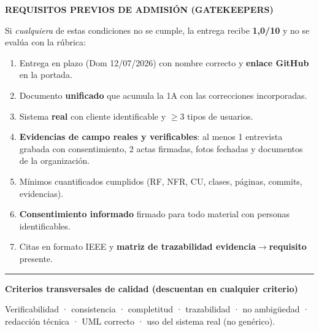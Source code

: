 \documentclass[11pt,a4paper]{article}
\newcounter{secc}
\newcommand{\secband}[1]{%
  \stepcounter{secc}\par\vspace{9pt}\noindent
  {\setlength{\fboxsep}{0pt}%
   \colorbox{uteqgold}{\parbox[c][20pt][c]{0.05\textwidth}{\centering\textbf{\color{white}\small \arabic{secc}}}}%
   \colorbox{uteqgreen}{\parbox[c][20pt][c]{0.95\textwidth}{\hspace{8pt}\textbf{\color{white}\small #1}}}%
  }\par\vspace{5pt}}
\newcommand{\submark}[1]{\par\vspace{4pt}\noindent
  {\color{uteqgreen}\rule[-1pt]{3.5pt}{12pt}}\hspace{6pt}\textbf{\color{uteqgreen}#1}\par\vspace{2pt}}
\begin{document}
\secband{REQUISITOS PREVIOS DE ADMISIÓN (GATEKEEPERS)}
\begin{alertbox}
\small Si \emph{cualquiera} de estas condiciones no se cumple, la entrega recibe \textbf{1,0/10} y no se evalúa con la rúbrica:
\begin{enumerate}[label=\textbf{G\arabic*.},itemsep=1pt]
\item Entrega en plazo (Dom 12/07/2026) con nombre correcto y \textbf{enlace GitHub} en la portada.
\item Documento \textbf{unificado} que acumula la 1A con las correcciones incorporadas.
\item Sistema \textbf{real} con cliente identificable y $\ge$3 tipos de usuarios.
\item \textbf{Evidencias de campo reales y verificables}: al menos 1 entrevista grabada con consentimiento, 2 actas firmadas, fotos fechadas y documentos de la organización.
\item Mínimos cuantificados cumplidos (RF, NFR, CU, clases, páginas, commits, evidencias).
\item \textbf{Consentimiento informado} firmado para todo material con personas identificables.
\item Citas en formato IEEE y \textbf{matriz de trazabilidad evidencia$\rightarrow$requisito} presente.
\end{enumerate}
\end{alertbox}

\submark{Criterios transversales de calidad (descuentan en cualquier criterio)}
Verificabilidad · consistencia · completitud · trazabilidad · no ambigüedad · redacción técnica · UML correcto · uso del sistema real (no genérico).
\end{document}
